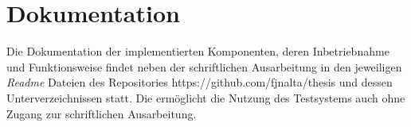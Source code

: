 \section{Dokumentation}
Die Dokumentation der implementierten Komponenten, deren Inbetriebnahme und Funktionsweise findet neben der schriftlichen Ausarbeitung in den jeweiligen \textit{Readme} Dateien des Repositories https://github.com/fjnalta/thesis und dessen Unterverzeichnissen statt. Die ermöglicht die Nutzung des Testsystems auch ohne Zugang zur schriftlichen Ausarbeitung.